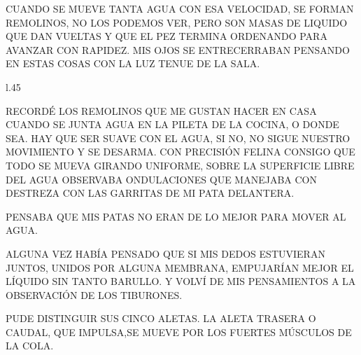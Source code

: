 CUANDO SE MUEVE TANTA AGUA CON ESA VELOCIDAD, SE FORMAN REMOLINOS, NO LOS PODEMOS VER, PERO SON MASAS DE LIQUIDO QUE DAN VUELTAS Y QUE EL PEZ TERMINA  ORDENANDO PARA AVANZAR CON RAPIDEZ. MIS OJOS SE ENTRECERRABAN PENSANDO EN ESTAS COSAS CON LA LUZ TENUE DE LA SALA.
\fi
\newpage
{}
\begin{wrapfigure}[10]{l}{.45\textwidth}\vspace{-1.25cm}%
\end{wrapfigure}
RECORDÉ LOS REMOLINOS QUE ME GUSTAN HACER EN CASA CUANDO SE JUNTA AGUA EN LA PILETA DE LA COCINA, O DONDE SEA. HAY QUE SER SUAVE CON EL AGUA, SI NO, NO SIGUE NUESTRO MOVIMIENTO Y SE DESARMA. CON PRECISIÓN FELINA CONSIGO QUE TODO SE MUEVA GIRANDO UNIFORME, SOBRE LA SUPERFICIE LIBRE DEL AGUA OBSERVABA ONDULACIONES QUE MANEJABA CON DESTREZA CON LAS GARRITAS DE MI PATA DELANTERA.

PENSABA QUE MIS PATAS NO ERAN DE LO MEJOR PARA MOVER AL AGUA. 

\newpage
{}

ALGUNA VEZ HABÍA PENSADO QUE SI MIS DEDOS ESTUVIERAN JUNTOS, UNIDOS POR ALGUNA MEMBRANA, EMPUJARÍAN MEJOR EL LÍQUIDO SIN TANTO BARULLO. Y VOLVÍ DE MIS PENSAMIENTOS A LA OBSERVACIÓN DE LOS TIBURONES.

PUDE DISTINGUIR SUS CINCO ALETAS. LA ALETA TRASERA O CAUDAL, QUE IMPULSA,SE MUEVE POR LOS FUERTES MÚSCULOS DE LA COLA.

\begin{center}

\begin{minipage}[r]{.7\textwidth}%
\end{minipage}
	
\end{center}
\newpage
{}

